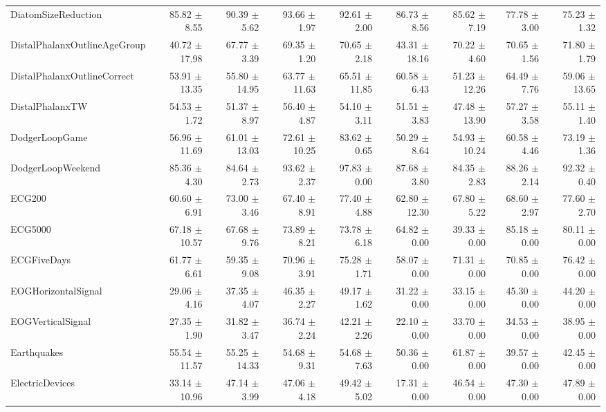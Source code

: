 \begin{landscape}
\begin{longtable}{lrrrrrrrr}
DiatomSizeReduction & 85.82 $\pm$ 8.55 & 90.39 $\pm$ 5.62 & 93.66 $\pm$ 1.97 & 92.61 $\pm$ 2.00 & 86.73 $\pm$ 8.56 & 85.62 $\pm$ 7.19 & 77.78 $\pm$ 3.00 & 75.23 $\pm$ 1.32 \\
DistalPhalanxOutlineAgeGroup & 40.72 $\pm$ 17.98 & 67.77 $\pm$ 3.39 & 69.35 $\pm$ 1.20 & 70.65 $\pm$ 2.18 & 43.31 $\pm$ 18.16 & 70.22 $\pm$ 4.60 & 70.65 $\pm$ 1.56 & 71.80 $\pm$ 1.79 \\
DistalPhalanxOutlineCorrect & 53.91 $\pm$ 13.35 & 55.80 $\pm$ 14.95 & 63.77 $\pm$ 11.63 & 65.51 $\pm$ 11.85 & 60.58 $\pm$ 6.43 & 51.23 $\pm$ 12.26 & 64.49 $\pm$ 7.76 & 59.06 $\pm$ 13.65 \\
DistalPhalanxTW & 54.53 $\pm$ 1.72 & 51.37 $\pm$ 8.97 & 56.40 $\pm$ 4.87 & 54.10 $\pm$ 3.11 & 51.51 $\pm$ 3.83 & 47.48 $\pm$ 13.90 & 57.27 $\pm$ 3.58 & 55.11 $\pm$ 1.40 \\
DodgerLoopGame & 56.96 $\pm$ 11.69 & 61.01 $\pm$ 13.03 & 72.61 $\pm$ 10.25 & 83.62 $\pm$ 0.65 & 50.29 $\pm$ 8.64 & 54.93 $\pm$ 10.24 & 60.58 $\pm$ 4.46 & 73.19 $\pm$ 1.36 \\
DodgerLoopWeekend & 85.36 $\pm$ 4.30 & 84.64 $\pm$ 2.73 & 93.62 $\pm$ 2.37 & 97.83 $\pm$ 0.00 & 87.68 $\pm$ 3.80 & 84.35 $\pm$ 2.83 & 88.26 $\pm$ 2.14 & 92.32 $\pm$ 0.40 \\
ECG200 & 60.60 $\pm$ 6.91 & 73.00 $\pm$ 3.46 & 67.40 $\pm$ 8.91 & 77.40 $\pm$ 4.88 & 62.80 $\pm$ 12.30 & 67.80 $\pm$ 5.22 & 68.60 $\pm$ 2.97 & 77.60 $\pm$ 2.70 \\
ECG5000 & 67.18 $\pm$ 10.57 & 67.68 $\pm$ 9.76 & 73.89 $\pm$ 8.21 & 73.78 $\pm$ 6.18 & 64.82 $\pm$ 0.00 & 39.33 $\pm$ 0.00 & 85.18 $\pm$ 0.00 & 80.11 $\pm$ 0.00 \\
ECGFiveDays & 61.77 $\pm$ 6.61 & 59.35 $\pm$ 9.08 & 70.96 $\pm$ 3.91 & 75.28 $\pm$ 1.71 & 58.07 $\pm$ 0.00 & 71.31 $\pm$ 0.00 & 70.85 $\pm$ 0.00 & 76.42 $\pm$ 0.00 \\
EOGHorizontalSignal & 29.06 $\pm$ 4.16 & 37.35 $\pm$ 4.07 & 46.35 $\pm$ 2.27 & 49.17 $\pm$ 1.62 & 31.22 $\pm$ 0.00 & 33.15 $\pm$ 0.00 & 45.30 $\pm$ 0.00 & 44.20 $\pm$ 0.00 \\
EOGVerticalSignal & 27.35 $\pm$ 1.90 & 31.82 $\pm$ 3.47 & 36.74 $\pm$ 2.24 & 42.21 $\pm$ 2.26 & 22.10 $\pm$ 0.00 & 33.70 $\pm$ 0.00 & 34.53 $\pm$ 0.00 & 38.95 $\pm$ 0.00 \\
Earthquakes & 55.54 $\pm$ 11.57 & 55.25 $\pm$ 14.33 & 54.68 $\pm$ 9.31 & 54.68 $\pm$ 7.63 & 50.36 $\pm$ 0.00 & 61.87 $\pm$ 0.00 & 39.57 $\pm$ 0.00 & 42.45 $\pm$ 0.00 \\
ElectricDevices & 33.14 $\pm$ 10.96 & 47.14 $\pm$ 3.99 & 47.06 $\pm$ 4.18 & 49.42 $\pm$ 5.02 & 17.31 $\pm$ 0.00 & 46.54 $\pm$ 0.00 & 47.30 $\pm$ 0.00 & 47.89 $\pm$ 0.00 \\

\end{longtable}
\end{landscape}
